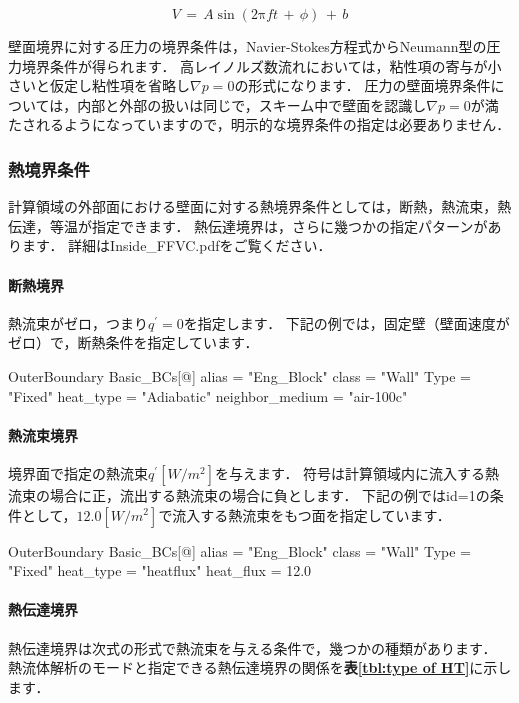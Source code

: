 \begin{equation}
V \,{=}\, A \sin \left( 2 \mathrm{\pi} ft \,+\, \phi \right) \,+\, b
\label{eq:harmonic out}
\end{equation}


壁面境界に対する圧力の境界条件は，Navier-Stokes方程式からNeumann型の圧力境界条件が得られます．
高レイノルズ数流れにおいては，粘性項の寄与が小さいと仮定し粘性項を省略し$\nabla p=0$の形式になります．
圧力の壁面境界条件については，内部と外部の扱いは同じで，スキーム中で壁面を認識し$\nabla p=0$が満たされるようになっていますので，明示的な境界条件の指定は必要ありません．

%
\subsubsection{熱境界条件}
計算領域の外部面における壁面に対する熱境界条件としては，断熱，熱流束，熱伝達，等温が指定できます．
熱伝達境界は，さらに幾つかの指定パターンがあります．
詳細はInside\_FFVC.pdfをご覧ください．

%
\paragraph{断熱境界}
熱流束がゼロ，つまり$q^{\prime}=0$を指定します．
下記の例では，固定壁（壁面速度がゼロ）で，断熱条件を指定しています．

{\small
\begin{program}
OuterBoundary {
  Basic_BCs[@] {
    alias            = "Eng_Block"
    class            = "Wall"
    Type             = "Fixed"
    heat_type        = "Adiabatic"
    neighbor_medium  = "air-100c"
  }
}
\end{program}
}

%
\paragraph{熱流束境界}
境界面で指定の熱流束$q^{\prime}[W/m^2]$を与えます．
符号は計算領域内に流入する熱流束の場合に正，流出する熱流束の場合に負とします．
下記の例ではid=1の条件として，$12.0[W/m^2]$で流入する熱流束をもつ面を指定しています．

{\small
\begin{program}
OuterBoundary {
  Basic_BCs[@] {
    alias            = "Eng_Block"
    class            = "Wall"
    Type             = "Fixed"
    heat_type        = "heatflux"
    heat_flux        = 12.0
  }
}
\end{program}
}


%
\hypertarget{tgt:heat-transfer}{\paragraph{熱伝達境界}}
熱伝達境界は次式の形式で熱流束を与える条件で，幾つかの種類があります．
熱流体解析のモードと指定できる熱伝達境界の関係を\textbf{表\ref{tbl:type of HT}}に示します．

